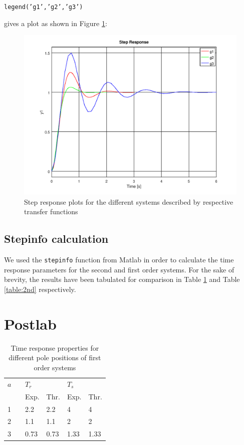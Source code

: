 \documentclass[a4paper, 12pt]{article}
\begin{document}
		\texttt{legend('g1','g2','g3')}



		gives a plot as shown in Figure \ref{plot_question_2_lab}:

		\begin{figure}[H]
			\includegraphics[width=\textwidth]{img/Question_2_Lab_Plots.png}
			\caption{Step response plots for the different systems described by respective transfer functions}
			\label{plot_question_2_lab}
		\end{figure}

		\subsection{Stepinfo calculation} %
		\label{sub:stepinfo_calculation}
			We used the \texttt{stepinfo} function from Matlab in order to calculate the time response parameters for the second and first order systems. For the sake of brevity, the results have been tabulated for comparison in Table \ref{table:1st} and Table \ref{table:2nd} respectively.


	\section{Postlab} %
	\label{sec:postlab}
		\begin{table}[H]
			\begin{tabularx}{\textwidth}{X X X X X X}
				\toprule
				\multicolumn{2}{X}{$a$} & \multicolumn{2}{X}{$T_r$} & \multicolumn{2}{X}{$T_s$} \\
				& & Exp. & Thr. & Exp. & Thr. \\
				\midrule
				1 & & 2.2 & 2.2 & 4 & 4 \\
				2 & & 1.1 & 1.1 & 2 & 2 \\
				3 & & 0.73 & 0.73 & 1.33 & 1.33 \\
				\bottomrule
			\end{tabularx}
			\caption{Time response properties for different pole positions of first order systems}
			\label{table:1st}
		\end{table}
\end{document}
